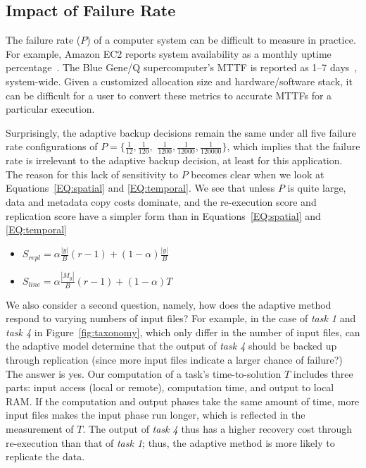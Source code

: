 \documentclass{sig-alternate}
\newcommand{\iannote}[1]{ {\textcolor{red}    { ***Ian:      #1 }}}
\newcommand{\katznote}[1]{ {\textcolor{blue}    { ***Dan:      #1 }}}
\newcommand{\zhaonote}[1]{{\textcolor{cyan}    { ***Zhao:      #1 }}}
\newcommand{\iannote}[1]{}
\newcommand{\katznote}[1]{}
\newcommand{\zhaonote}[1]{}
\begin{document}
\subsection{Impact of Failure Rate}
\label{sec:Perf:Failure}
The failure rate ($P$) of a computer system can be difficult to measure in practice.
For example, Amazon EC2 reports  system availability as a monthly uptime percentage~\cite{AWS-SLA}.
The Blue Gene/Q supercomputer's MTTF is reported as 1--7 days~\cite{Snir-resilience}, system-wide.
Given a customized allocation size
and hardware/software stack, it can be difficult for a user to convert these metrics to accurate MTTFs for a particular execution.

Surprisingly, the adaptive backup decisions remain the same under all five failure rate configurations of $P=\{\frac{1}{12}, \frac{1}{120},$ 
$\frac{1}{1200}, \frac{1}{12000}, \frac{1}{120000}\}$,
which implies that the failure rate is irrelevant to the adaptive backup decision, at least for this application.
The reason for this lack of sensitivity to $P$ becomes clear when we look at Equations~\ref{EQ:spatial} and \ref{EQ:temporal}.
We see that unless $P$ is quite large, data and metadata copy costs dominate,
%
and the re-execution score and replication score have a simpler form than in Equations~\ref{EQ:spatial} and \ref{EQ:temporal}
\begin{itemize}
  \item[] $S_{repl} = \alpha\frac{|y|}{B}(r-1) + (1-\alpha)\frac{|y|}{B} $
  \item[] $S_{line} = \alpha\frac{|M_y|}{B}(r-1) + (1-\alpha)T$
\end{itemize}

We also consider a second question, namely, how does the adaptive method respond to varying numbers of input files?
For example, in the case of {\em task 1} and {\em task 4} in Figure~\ref{fig:taxonomy}, which only differ in the number of input files, can the adaptive model determine that the output of {\em task 4} should be backed up through replication (since more input files indicate a larger chance of failure?)
The answer is yes.
Our computation of a task's time-to-solution $T$ includes three parts: input access (local or remote), computation time, and output to local RAM. If the computation and output phases take the same amount of time, more input files makes the input phase run longer, which is reflected in the measurement of $T$. The output of {\em task 4} thus has a higher recovery cost through re-execution than that of {\em task 1}; thus, the adaptive method is more likely to replicate the data.
\end{document}
